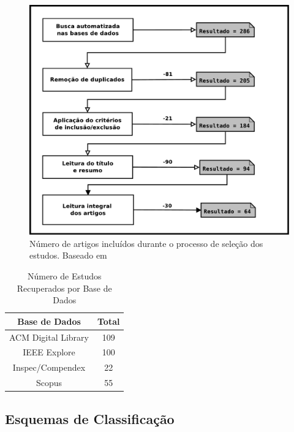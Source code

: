 
\begin{figure}
	\centering
	\includegraphics[width=0.75\linewidth]
	{./chapter-mapeamento-sistematico/img/diagrama-processo-selecao.pdf}
	\caption{Número de artigos incluídos durante o processo de seleção dos
		estudos. Baseado
		em~\cite{Petersen2015}}\label{fig:diagrama-processo-selecao}
\end{figure}

\begin{table}[htb]
	\centering
	\caption{Número de Estudos Recuperados por Base de Dados}\label{tab:estudos-por-base-dados}
	\begin{tabular}{cc}
		\hline
		\textbf{Base de Dados} & \textbf{Total} \\ \hline
		ACM Digital Library    & 109            \\
		IEEE Explore           & 100            \\
		Inspec/Compendex       & 22             \\
		Scopus                 & 55             \\ \hline
	\end{tabular}

\end{table}

\subsection{Esquemas de Classificação}
\label{subsec:map-esquemas-classificacao}

